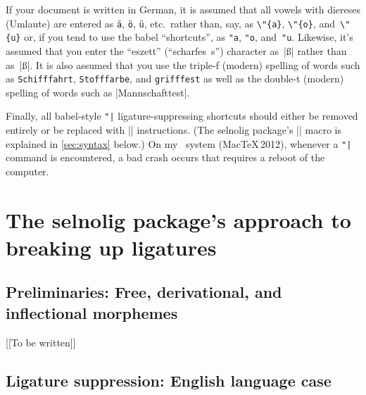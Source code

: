 \documentclass[11pt]{article}
\newcommand{\pkg}[1]{\textsf{#1}}
\newcommand{\opt}[1]{\texttt{#1}}
\newcommand{\cmmd}[1]{\texttt{\textbackslash #1}}
\begin{document}
If your document is written in German, it is assumed that all vowels with diereses (Umlaute) are entered as \Verb|ä|, \Verb|ö|, \Verb|ü|, etc.\ rather than, say, as \Verb|\"{a}|, \Verb|\"{o}|, and~\Verb|\"{u}| or, if you tend to use the \pkg{babel} \enquote{shortcuts}, as \Verb|"a|, \Verb|"o|, and~\Verb|"u|. Likewise, it's assumed that you enter the \enquote{eszett} (\enquote{scharfes~s}) character as~|ß| rather than as~|\ss|.
It is also assumed that you use the triple-f (modern) spelling of words such as \texttt{Schifffahrt}, \texttt{Stofffarbe}, and \texttt{grifffest} as well as the double-t (modern) spelling of words such as |Mannschafttest|.

Finally, all \pkg{babel}-style \Verb+"|+ ligature-suppressing shortcuts should either be removed entirely or be replaced with |\breaklig| instructions. (The \pkg{selnolig} package's |\breaklig| macro is explained in \cref{sec:syntax} below.) On my \LuaLaTeX\ system (MacTeX\,2012), whenever a \Verb+"|+ command is encountered, a bad crash occurs that requires a reboot of the computer.





\section[The selnolig package's approach to breaking up ligatures]{The \pkg{selnolig} package's approach to breaking up ligatures}

\subsection{Preliminaries: Free, derivational, and inflectional morphemes}

[[To be written]]


%

\subsection{Ligature suppression: English language case}
\end{document}
